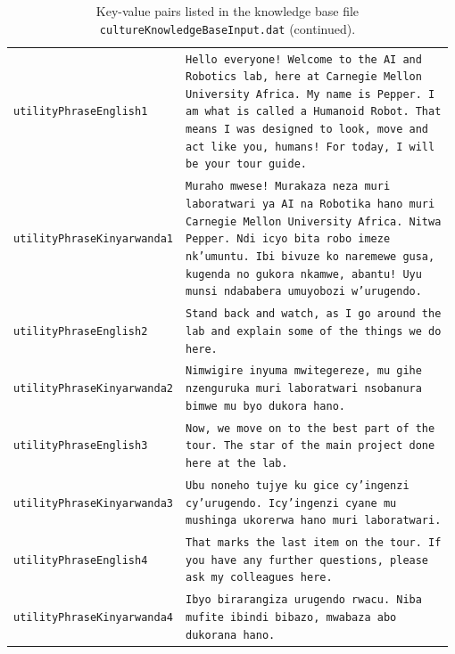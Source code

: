 \documentclass{CSSRforAfrica}
\begin{document}
\begin{table}[H]
\caption{Key-value pairs listed in the knowledge base file  {\tt \small cultureKnowledgeBaseInput.dat} (continued).}
\label{fig:cultureKnowledgeBase2}
\vspace{-3mm}
\begin{tabular}{p{0.3\linewidth} p{0.68\linewidth}}
\footnotesize\texttt{utilityPhraseEnglish1} &
\footnotesize\texttt{Hello everyone! Welcome to the AI and Robotics lab, here at Carnegie Mellon University Africa. My name is Pepper. I am what is called a Humanoid Robot. That means I was designed to look, move and act like you, humans! For today, I will be your tour guide.} \\

\footnotesize\texttt{utilityPhraseKinyarwanda1} &
\footnotesize\texttt{Muraho mwese! Murakaza neza muri laboratwari ya AI na Robotika hano muri Carnegie Mellon University Africa. Nitwa Pepper. Ndi icyo bita robo imeze nk’umuntu. Ibi bivuze ko naremewe gusa, kugenda no gukora nkamwe, abantu! Uyu munsi ndababera umuyobozi w’urugendo.} \\

\footnotesize\texttt{utilityPhraseEnglish2} &
\footnotesize\texttt{Stand back and watch, as I go around the lab and explain some of the things we do here.} \\

\footnotesize\texttt{utilityPhraseKinyarwanda2} &
\footnotesize\texttt{Nimwigire inyuma mwitegereze, mu gihe nzenguruka muri laboratwari nsobanura bimwe mu byo dukora hano.} \\

\footnotesize\texttt{utilityPhraseEnglish3} &
\footnotesize\texttt{Now, we move on to the best part of the tour. The star of the main project done here at the lab.} \\

\footnotesize\texttt{utilityPhraseKinyarwanda3} &
\footnotesize\texttt{Ubu noneho tujye ku gice cy’ingenzi cy’urugendo. Icy’ingenzi cyane mu mushinga ukorerwa hano muri laboratwari.} \\

\footnotesize\texttt{utilityPhraseEnglish4} &
\footnotesize\texttt{That marks the last item on the tour. If you have any further questions, please ask my colleagues here.} \\

\footnotesize\texttt{utilityPhraseKinyarwanda4} &
\footnotesize\texttt{Ibyo birarangiza urugendo rwacu. Niba mufite ibindi bibazo, mwabaza abo dukorana hano.} \\




\end{tabular}
\end{table}
\end{document}
